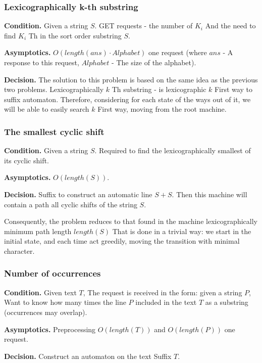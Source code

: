 \subsubsection{ Lexicographically k-th substring }

\textbf{Condition.} Given a string $S$. GET requests - the number of $K_i$ And the need to find $K_i$ Th in the sort order substring $S$.

\textbf{Asymptotics.} $O (length (ans) \cdot Alphabet)$ one request (where $ans$ - A response to this request, $Alphabet$ - The size of the alphabet).

\textbf{Decision.} The solution to this problem is based on the same idea as the previous two problems. Lexicographically $k$ Th substring - is lexicographic $k$ First way to suffix automaton. Therefore, considering for each state of the ways out of it, we will be able to easily search $k$ First way, moving from the root machine.

\subsubsection{ The smallest cyclic shift }

\textbf{Condition.} Given a string $S$. Required to find the lexicographically smallest of its cyclic shift.

\textbf{Asymptotics.} $O (length (S))$.

\textbf{Decision.} Suffix to construct an automatic line $S + S$. Then this machine will contain a path all cyclic shifts of the string $S$.

Consequently, the problem reduces to that found in the machine lexicographically minimum path length $length (S)$ That is done in a trivial way: we start in the initial state, and each time act greedily, moving the transition with minimal character.

\subsubsection{ Number of occurrences }

\textbf{Condition.} Given text $T$, The request is received in the form: given a string $P$, Want to know how many times the line $P$ included in the text $T$ as a substring (occurrences may overlap).

\textbf{Asymptotics.} Preprocessing $O (length (T))$ and $O (length (P))$ one request.

\textbf{Decision.} Construct an automaton on the text Suffix $T$.

